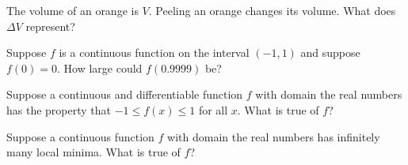 \documentclass{ximera}
\newcommand{\recommendation}[1]{}
\newcommand{\GoodQuestions}[1]{}
\begin{document}
\begin{shuffle}
\begin{problem}
  The volume of an orange is $V$.  Peeling an orange changes its volume.  What does $\Delta V$
  represent?  
  \begin{multipleChoice}
  \end{multipleChoice}
\end{problem}




\begin{problem}
  Suppose $f$ is a continuous function on the interval $(-1,1)$ and suppose $f(0) = 0$.  How large could $f(0.9999)$ be?
  \begin{multipleChoice}
  \end{multipleChoice}
\end{problem}

\begin{problem}
  Suppose a continuous and differentiable function $f$ with domain the
  real numbers has the property that $-1 \leq f(x) \leq 1$ for all
  $x$.  What is true of $f$?
  \begin{multipleChoice}
  \end{multipleChoice}
\end{problem}

\begin{problem}
  Suppose a continuous function $f$ with domain the real numbers has infinitely many local minima.  What is true of $f$?
  \begin{multipleChoice}
  \end{multipleChoice}
\end{problem}


\end{shuffle}
\end{document}
